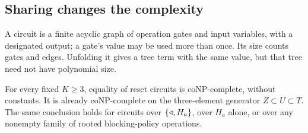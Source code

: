 \subsection{Sharing changes the complexity}
\label{app:proofs-circuits}

A circuit is a finite acyclic graph of operation gates and input
variables, with a designated output; a gate's value may be used more
than once. Its size counts gates and edges. Unfolding it gives a tree
term with the same value, but that tree need not have polynomial size.

\begin{theorem}\label{reset:thm:circuits}
For every fixed $K\geq3$, equality of reset circuits is coNP-complete,
without constants. It is already coNP-complete on the three-element
generator $Z\subset U\subset T$. The same conclusion holds for
circuits over $\{\mathbin{\triangleleft},H_a\}$, over $H_a$ alone, or over any nonempty
family of rooted blocking-policy operations.
\end{theorem}
